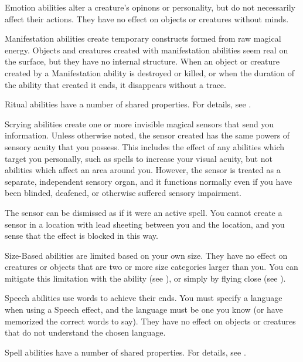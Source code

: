    Emotion abilities alter a creature's opinons or personality, but do not necessarily affect their actions.
  They have no effect on objects or creatures without minds.

   Manifestation abilities create temporary constructs formed from raw magical energy.
  Objects and creatures created with manifestation abilities seem real on the surface, but they have no internal structure.
  When an object or creature created by a Manifestation ability is destroyed or killed, or when the duration of the ability that created it ends, it disappears without a trace.

   Ritual abilities have a number of shared properties.
  For details, see .

   Scrying abilities create one or more invisible magical sensors that send you information.
  Unless otherwise noted, the sensor created has the same powers of sensory acuity that you possess.
  This includes the effect of any abilities which target you personally, such as spells to increase your visual acuity, but not abilities which affect an area around you.
  However, the sensor is treated as a separate, independent sensory organ, and it functions normally even if you have been blinded, deafened, or otherwise suffered sensory impairment.
  \par The sensor can be dismissed as if it were an active spell.
  You cannot create a sensor in a location with lead sheeting between you and the location, and you sense that the effect is blocked in this way.

   Size-Based abilities are limited based on your own size.
  They have no effect on creatures or objects that are two or more size categories larger than you.
  You can mitigate this limitation with the  ability (see ), or simply by flying close (see ).

   Speech abilities use words to achieve their ends.
  You must specify a language when using a Speech effect, and the language must be one you know (or have memorized the correct words to say). They have no effect on objects or creatures that do not understand the chosen language.

   Spell abilities have a number of shared properties.
  For details, see .

